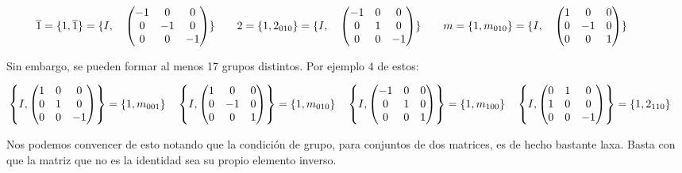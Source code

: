 \documentclass{report}
\begin{document}
\vspace{.2cm}
\[\hspace{-1cm}
\overline{1} = \{ 1, \overline{1} \}
= \{
I, \quad
\begin{pmatrix}
-1 & 0 & 0 \\
0 & -1 & 0 \\
0 & 0 & -1
\end{pmatrix} \}
\qquad
2 = \{ 1, 2_{010} \}
 = \{
I, \quad
\begin{pmatrix}
-1 & 0 & 0 \\
0 & 1 & 0 \\
0 & 0 & -1
\end{pmatrix} \}
\qquad
m = \{ 1, m_{010} \}
= \{
I, \quad
\begin{pmatrix}
1 & 0 & 0 \\
0 & -1 & 0 \\
0 & 0 & 1
\end{pmatrix}  \}
\]


Sin embargo, se pueden formar al menos 17 grupos distintos. Por ejemplo 4 de estos:


\[\hspace{-.5cm}
 \left\{
I,
\begin{pmatrix}
1 & 0 & 0 \\
0 & 1 & 0 \\
0 & 0 & -1
\end{pmatrix}
\right\}
= \{ 1, m_{001} \} \quad 
 \left\{
I,
\begin{pmatrix}
1 & 0 & 0 \\
0 & -1 & 0 \\
0 & 0 & 1
\end{pmatrix}
\right\}
= \{ 1, m_{010} \} \quad 
 \left\{
I,
\begin{pmatrix}
-1 & 0 & 0 \\
0 & 1 & 0 \\
0 & 0 & 1
\end{pmatrix}
\right\}
= \{ 1, m_{100} \} \quad 
\left\{
I,
\begin{pmatrix}
0 & 1 & 0 \\
1 & 0 & 0 \\
0 & 0 & -1
\end{pmatrix}
\right\}
= \{ 1, 2_{110} \} 
\]



Nos podemos convencer de esto notando que la condición de grupo, para conjuntos de dos matrices, es de hecho bastante laxa. Basta con que la matriz que no es la identidad sea su propio elemento inverso. \\
\end{document}
